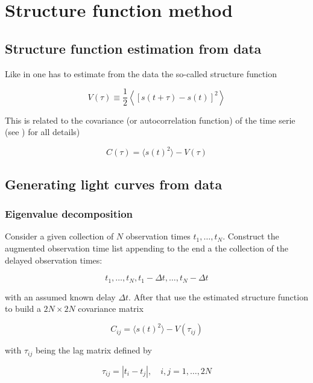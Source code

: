 \section{Structure function method}

\subsection{Structure function estimation from data}

Like in \cite{Press1992} one has to estimate from the data the so-called structure function

\begin{equation}
V(\tau) \equiv \frac{1}{2} \left \langle \left [ s(t+\tau) - s(t) \right ]^2  \right \rangle
\end{equation}

This is related to the covariance (or autocorrelation function) of the time serie (see \cite{Press1992}) for all details)

\begin{equation}
C(\tau) = \langle s(t)^2 \rangle - V(\tau)
\end{equation}

\subsection{Generating light curves from data}

\subsubsection{Eigenvalue decomposition}

Consider a given collection of $N$ observation times $t_1, \dots , t_N$. Construct the augmented observation time list appending to the end a the collection of the delayed observation times:

\[
t_1, \dots , t_N, t_1 - \Delta t, \dots, t_N - \Delta t
\]

with an assumed known delay $\Delta t$. After that use the estimated structure function to build a $2N \times 2N$ covariance matrix

\begin{equation}
C_{ij} = \langle s(t)^2 \rangle - V(\tau_{ij})
\end{equation}

with $\tau_{ij}$ being the lag matrix defined by

\begin{equation}
\tau_{ij} = |t_i - t_j|, \quad i,j = 1, \dots , 2N
\end{equation}

